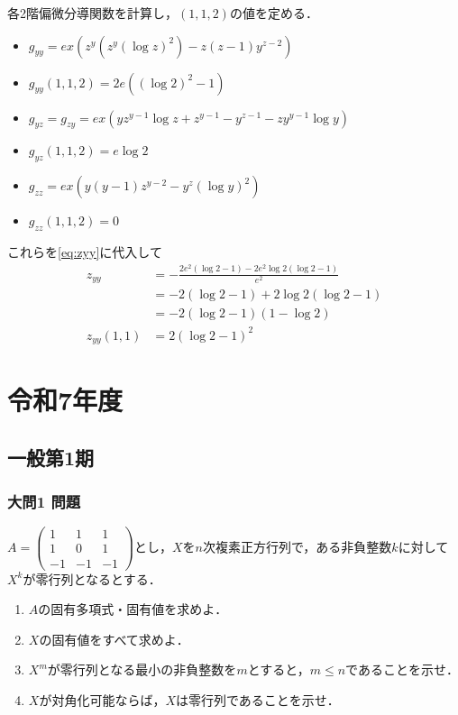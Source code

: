 \documentclass[dvipdfmx]{jsreport}
\begin{document}
\begin{souanswer}
\begin{enumerate}
\begin{enumerate_roman}
	各2階偏微分導関数を計算し，$(1, 1, 2)$の値を定める．
\begin{itemize}
	\item $g_{yy}= ex(z^y(z^y(\log{z})^2)- z(z- 1)y^{z- 2})$
	\item[$\Rightarrow$] $g_{yy}(1, 1, 2)= 2e((\log{2})^2- 1)$ 
	\item $g_{yz}= g_{zy}= ex(yz^{y- 1}\log{z}+ z^{y- 1}- y^{z- 1}- zy^{y- 1}\log{y})$
	\item[$\Rightarrow$] $g_{yz}(1, 1, 2)= e\log{2}$
	\item $g_{zz}= ex(y(y- 1)z^{y- 2}- y^z(\log{y})^2)$
	\item[$\Rightarrow$] $g_{zz}(1, 1, 2)= 0$
\end{itemize}
	これらを\eqref{eq:zyy}に代入して
\begin{align*}
	z_{yy}
	&= -\frac{2e^2(\log{2}- 1)- 2e^2\log{2}(\log{2}- 1)}{e^2}\\
	&= -2(\log{2}- 1)+ 2\log{2}(\log{2}- 1)\\
	&= -2(\log{2}- 1)(1- \log{2})\\
	z_{yy}(1, 1)
	&= 2(\log{2}- 1)^2
\end{align*}
\end{enumerate_roman}
\end{enumerate}
\end{souanswer}

\part{令和7年度}
\chapter{一般第1期}
\section{大問1 問題}
\begin{tcolorbox} %
	$A= \begin{pmatrix}1& 1& 1\\ 1& 0& 1\\ {-1}& {-1}& {-1}\end{pmatrix}$とし，$X$を$n$次複素正方行列で，ある非負整数$k$に対して$X^k$が零行列となるとする．
\begin{enumerate}
	\item $A$の固有多項式・固有値を求めよ．
	\item $X$の固有値をすべて求めよ．
	\item $X^m$が零行列となる最小の非負整数を$m$とすると，$m\le n$であることを示せ．
	\item $X$が対角化可能ならば，$X$は零行列であることを示せ．
\end{enumerate}
\end{tcolorbox}
\end{document}
